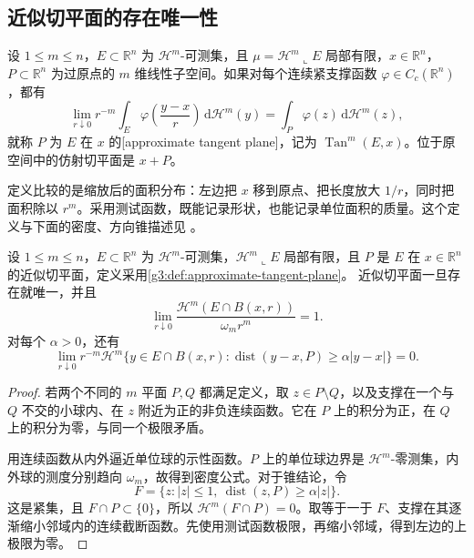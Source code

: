\subsection{近似切平面的存在唯一性}
\label{g3:subsec:2005:02}
\begin{definition}\label{g3:def:approximate-tangent-plane}
	设 \(1\le m\le n\)，\(E\subset\mathbb R^n\) 为 \(\mathcal H^m\)-可测集，且 \(\mu=\mathcal H^m\llcorner E\) 局部有限，\(x\in\mathbb R^n\)，\(P\subset\mathbb R^n\) 为过原点的 \(m\) 维线性子空间。如果对每个连续紧支撑函数 \(\varphi\in C_c(\mathbb R^n)\)，都有
	\begin{equation}\label{g3:eq:rectifiable-blowup}
		\lim_{r\downarrow0}r^{-m}\int_E
		\varphi\!\left(\frac{y-x}{r}\right)\,\mathrm d\mathcal H^m(y)
		=\int_P\varphi(z)\,\mathrm d\mathcal H^m(z),
	\end{equation}
	就称 \(P\) 为 \(E\) 在 \(x\) 的[approximate tangent plane]，记为 \(\operatorname{Tan}^m(E,x)\)。位于原空间中的仿射切平面是 \(x+P\)。
\end{definition}

定义比较的是缩放后的面积分布：左边把 \(x\) 移到原点、把长度放大 \(1/r\)，同时把面积除以 \(r^m\)。采用测试函数，既能记录形状，也能记录单位面积的质量。这个定义与下面的密度、方向锥描述见 \cite[第11节，定义11.2及定理11.6，第59--63页]{Simon1983}。

\begin{proposition}\label{g3:prop:approximate-tangent-consequences}
	设 \(1\le m\le n\)，\(E\subset\mathbb R^n\) 为 \(\mathcal H^m\)-可测集，\(\mathcal H^m\llcorner E\) 局部有限，且 \(P\) 是 \(E\) 在 \(x\in\mathbb R^n\) 的近似切平面，定义采用\cref{g3:def:approximate-tangent-plane}。
	近似切平面一旦存在就唯一，并且
	\begin{equation}\label{g3:eq:rectifiable-density-one}
		\lim_{r\downarrow0}
		\frac{\mathcal H^m(E\cap B(x,r))}{\omega_mr^m}=1.
	\end{equation}
	对每个 \(\alpha>0\)，还有
	\begin{equation}\label{g3:eq:rectifiable-cone-concentration}
		\lim_{r\downarrow0}r^{-m}\mathcal H^m
		\{y\in E\cap B(x,r):\operatorname{dist}(y-x,P)\ge\alpha|y-x|\}=0.
	\end{equation}
\end{proposition}
\begin{proof}
	若两个不同的 \(m\) 平面 \(P,Q\) 都满足定义，取 \(z\in P\setminus Q\)，以及支撑在一个与 \(Q\) 不交的小球内、在 \(z\) 附近为正的非负连续函数。它在 \(P\) 上的积分为正，在 \(Q\) 上的积分为零，与同一个极限矛盾。

	用连续函数从内外逼近单位球的示性函数。\(P\) 上的单位球边界是 \(\mathcal H^m\)-零测集，内外球的测度分别趋向 \(\omega_m\)，故得到密度公式。对于锥结论，令
	\[
		F=\{z:|z|\le1,\ \operatorname{dist}(z,P)\ge\alpha|z|\}.
	\]
	这是紧集，且 \(F\cap P\subset\{0\}\)，所以 \(\mathcal H^m(F\cap P)=0\)。取等于一于 \(F\)、支撑在其逐渐缩小邻域内的连续截断函数。先使用测试函数极限，再缩小邻域，得到左边的上极限为零。
\end{proof}


